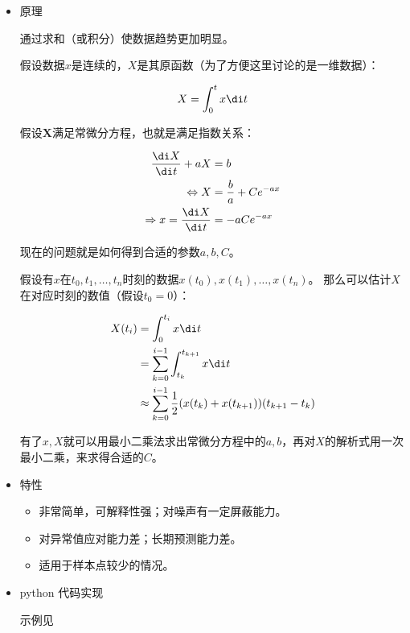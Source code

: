 \documentclass{article}
\begin{document}
\begin{itemize}

\item{原理}

通过求和（或积分）使数据趋势更加明显。

假设数据$x$是连续的，$X$是其原函数（为了方便这里讨论的是一维数据）：

\[X = \int_{0}^{t}x\di t\]

假设$\mathbf{X}$满足常微分方程，也就是满足指数关系：

\[\begin{split}
    \frac{\di X}{\di t} + aX & = b\\
    \Leftrightarrow X & = \frac{b}{a} + Ce^{-ax}\\
    \Rightarrow x = \frac{\di X}{\di t} & = -aCe^{-ax}\\
\end{split}\]

现在的问题就是如何得到合适的参数$a, b, C$。

假设有$x$在$t_0, t_1, \ldots, t_n$时刻的数据$x(t_0), x(t_1),\ldots, x(t_n)$。
那么可以估计$X$在对应时刻的数值（假设$t_0=0$）：

\[\begin{split}
X(t_i) & = \int_{0}^{t_i}x\di t\\
& = \sum_{k = 0}^{i - 1}\int_{t_k}^{t_{k + 1}} x \di t\\
& \approx \sum_{k = 0}^{i - 1}\frac{1}{2}(x(t_k) + x(t_{k + 1}))(t_{k + 1} - t_k)\\
\end{split}\]

有了$x, X$就可以用最小二乘法求出常微分方程中的$a, b$，再对$X$的解析式用一次最小二乘，来求得合适的$C$。

\item{特性}

\begin{itemize}
    \item 非常简单，可解释性强；对噪声有一定屏蔽能力。
    \item 对异常值应对能力差；长期预测能力差。
    \item 适用于样本点较少的情况。
\end{itemize}

\item{python 代码实现}


示例见

\end{itemize}
\end{document}
